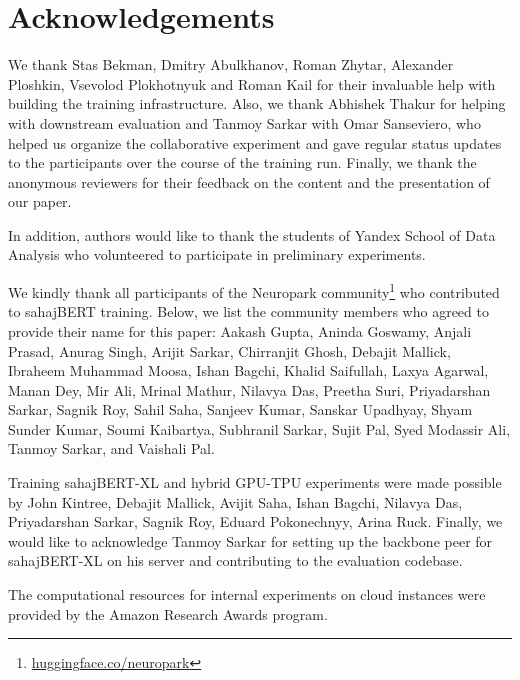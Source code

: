 \section*{Acknowledgements}
We thank Stas Bekman, Dmitry Abulkhanov, Roman Zhytar, Alexander Ploshkin, Vsevolod Plokhotnyuk and Roman Kail for their invaluable help with building the training infrastructure.
Also, we thank Abhishek Thakur for helping with downstream evaluation and Tanmoy Sarkar with Omar Sanseviero, who helped us organize the collaborative experiment and gave regular status updates to the participants over the course of the training run.
Finally, we thank the anonymous reviewers for their feedback on the content and the presentation of our paper.

In addition, authors would like to thank the students of Yandex School of Data Analysis who volunteered to participate in preliminary experiments.

We kindly thank all participants of the Neuropark community\footnote{\href{https://huggingface.co/neuropark}{huggingface.co/neuropark}} who contributed to sahajBERT training. Below, we list the community members who agreed to provide their name for this paper: Aakash Gupta, Aninda Goswamy, Anjali Prasad, Anurag Singh, Arijit Sarkar, Chirranjit Ghosh, Debajit Mallick, Ibraheem Muhammad Moosa, Ishan Bagchi, Khalid Saifullah, Laxya Agarwal, Manan Dey, Mir Ali, Mrinal Mathur, Nilavya Das, Preetha Suri, Priyadarshan Sarkar, Sagnik Roy, Sahil Saha, Sanjeev Kumar, Sanskar Upadhyay, Shyam Sunder Kumar, Soumi Kaibartya, Subhranil Sarkar, Sujit Pal, Syed Modassir Ali, Tanmoy Sarkar, and Vaishali Pal.

Training sahajBERT-XL and hybrid GPU-TPU experiments were made possible by John Kintree, Debajit Mallick, Avijit Saha, Ishan Bagchi, Nilavya Das, Priyadarshan Sarkar, Sagnik Roy, Eduard Pokonechnyy, Arina Ruck. Finally, we would like to acknowledge Tanmoy Sarkar for setting up the backbone peer for sahajBERT-XL on his server and contributing to the evaluation codebase.


The computational resources for internal experiments on cloud instances were provided by the Amazon Research Awards program.